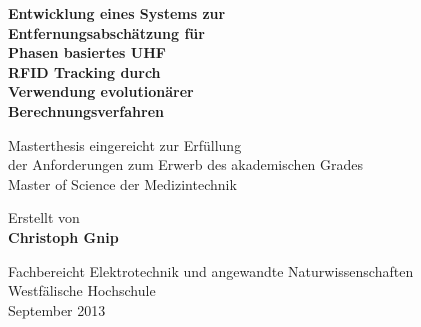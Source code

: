 
\begin{titlepage}
       \begin{center}
			{
			\Huge 
			\textbf{
			  Entwicklung eines Systems zur\\
			  Entfernungsabschätzung für\\
			  Phasen basiertes UHF \\
			  RFID Tracking durch \\
			  Verwendung evolutionärer\\
			  Berechnungsverfahren
			}\par
			}
			\vspace{3cm}
			{
			\Large Masterthesis eingereicht zur Erfüllung\\
			der Anforderungen zum Erwerb des akademischen Grades\\
			Master of Science der Medizintechnik\\
			}
\vspace{2cm}

\large{Erstellt von}\\

\Large{\textbf{Christoph Gnip}}


\vfill

{\normalsize Fachbereicht Elektrotechnik und angewandte Naturwissenschaften
           \\Westfälische Hochschule\\[2ex]September 2013}


       \end{center}
   \end{titlepage}

\newpage
{}
\thispagestyle{empty}
\hspace{1cm}

\newpage
\normalsize



